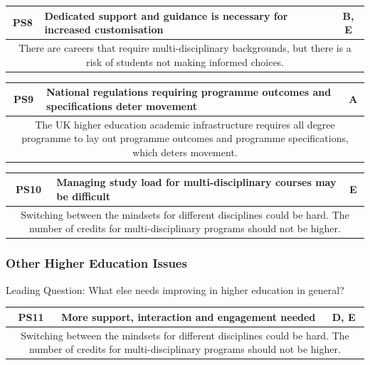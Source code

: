 \begin{table}[!ht]
	\begin{tabularx}{\textwidth}{|c|X|c|}
		\hline
		PS8 & \textbf{Dedicated support and guidance is necessary for increased customisation} & B, E \\
		\hline
		\multicolumn{3}{|X|}{There are careers that require multi-disciplinary backgrounds, but there is a risk of
			students not making informed choices.}                                                        \\
		\hline
	\end{tabularx}
\end{table}

\begin{table}[!ht]
	\begin{tabularx}{\textwidth}{|c|X|c|}
		\hline
		PS9 & \textbf{National regulations requiring programme outcomes and specifications deter movement} & A \\
		\hline
		\multicolumn{3}{|X|}{The UK higher education academic infrastructure requires all degree programme to lay out
			programme outcomes and programme specifications, which deters movement.}                               \\
		\hline
	\end{tabularx}
\end{table}

\begin{table}[!ht]
	\begin{tabularx}{\textwidth}{|c|X|c|}
		\hline
		PS10 & \textbf{Managing study load for multi-disciplinary courses may be difficult} & E \\
		\hline
		\multicolumn{3}{|X|}{Switching between the mindsets for different disciplines could be hard.
			The number of credits for multi-disciplinary programs should not be higher.}            \\
		\hline
	\end{tabularx}
\end{table}

\subsubsection{Other Higher Education Issues}

Leading Question: What else needs improving in higher education in general?

\begin{table}[!ht]
	\begin{tabularx}{\textwidth}{|c|X|c|}
		\hline
		PS11 & \textbf{More support, interaction and engagement needed} & D, E       \\
		\hline
		\multicolumn{3}{|X|}{Switching between the mindsets for different disciplines could be hard.
			The number of credits for multi-disciplinary programs should not be higher.} \\
		\hline
	\end{tabularx}
\end{table}

